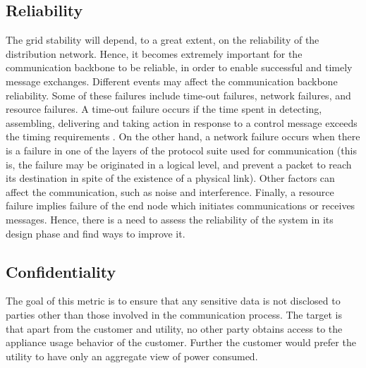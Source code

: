\documentclass[11pt,draftclsnofoot,onecolumn]{IEEEtran}
\begin{document}
\subsection{Reliability}
The grid stability will depend, to a great extent, on the reliability of the distribution network. Hence, it becomes extremely important for the communication backbone to be reliable, in order to enable successful and timely message exchanges. Different events may affect the communication backbone reliability. Some of these failures include time-out failures, network failures, and resource failures. A time-out failure occurs if the time spent in detecting, assembling, delivering and taking action in response to a control message exceeds the timing requirements \cite{Wang2011a}. On the other hand, a network failure occurs when there is a failure in one of the layers of the protocol suite used for communication (this is, the failure may be originated in a logical level, and prevent a packet to reach its destination in spite of the existence of a physical link). Other factors can affect the communication, such as noise and interference. Finally, a resource failure implies failure of the end node which initiates communications or receives messages. Hence, there is a need to assess the reliability of the system in its design phase and find ways to improve it.

\subsection{Confidentiality}
The goal of this metric is to ensure that any sensitive data is not disclosed to parties other than those involved in the communication process. The target is that apart from the customer and utility, no other party obtains access to the appliance usage behavior of the customer. Further the customer would prefer the utility to have only an aggregate view of power consumed.
\end{document}
